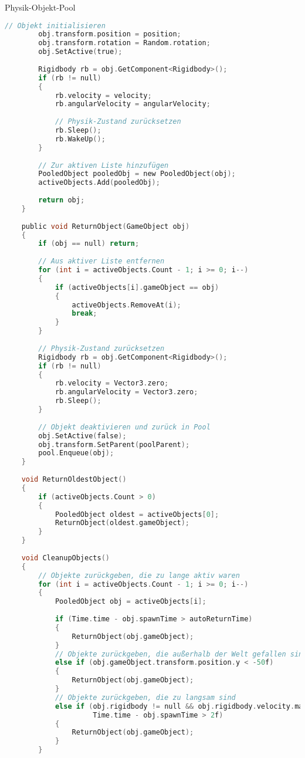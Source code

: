 \begin{code}{Physik-Objekt-Pool}
\begin{lstlisting}[language=C, style=basesmol]
        // Objekt initialisieren
        obj.transform.position = position;
        obj.transform.rotation = Random.rotation;
        obj.SetActive(true);
        
        Rigidbody rb = obj.GetComponent<Rigidbody>();
        if (rb != null) 
        {
            rb.velocity = velocity;
            rb.angularVelocity = angularVelocity;
            
            // Physik-Zustand zurücksetzen
            rb.Sleep();
            rb.WakeUp();
        }
        
        // Zur aktiven Liste hinzufügen
        PooledObject pooledObj = new PooledObject(obj);
        activeObjects.Add(pooledObj);
        
        return obj;
    }
    
    public void ReturnObject(GameObject obj) 
    {
        if (obj == null) return;
        
        // Aus aktiver Liste entfernen
        for (int i = activeObjects.Count - 1; i >= 0; i--) 
        {
            if (activeObjects[i].gameObject == obj) 
            {
                activeObjects.RemoveAt(i);
                break;
            }
        }
        
        // Physik-Zustand zurücksetzen
        Rigidbody rb = obj.GetComponent<Rigidbody>();
        if (rb != null) 
        {
            rb.velocity = Vector3.zero;
            rb.angularVelocity = Vector3.zero;
            rb.Sleep();
        }
        
        // Objekt deaktivieren und zurück in Pool
        obj.SetActive(false);
        obj.transform.SetParent(poolParent);
        pool.Enqueue(obj);
    }
    
    void ReturnOldestObject() 
    {
        if (activeObjects.Count > 0) 
        {
            PooledObject oldest = activeObjects[0];
            ReturnObject(oldest.gameObject);
        }
    }
    
    void CleanupObjects() 
    {
        // Objekte zurückgeben, die zu lange aktiv waren
        for (int i = activeObjects.Count - 1; i >= 0; i--) 
        {
            PooledObject obj = activeObjects[i];
            
            if (Time.time - obj.spawnTime > autoReturnTime) 
            {
                ReturnObject(obj.gameObject);
            }
            // Objekte zurückgeben, die außerhalb der Welt gefallen sind
            else if (obj.gameObject.transform.position.y < -50f) 
            {
                ReturnObject(obj.gameObject);
            }
            // Objekte zurückgeben, die zu langsam sind
            else if (obj.rigidbody != null && obj.rigidbody.velocity.magnitude < 0.1f && 
                     Time.time - obj.spawnTime > 2f) 
            {
                ReturnObject(obj.gameObject);
            }
        }
        

\end{lstlisting}
\end{code}
